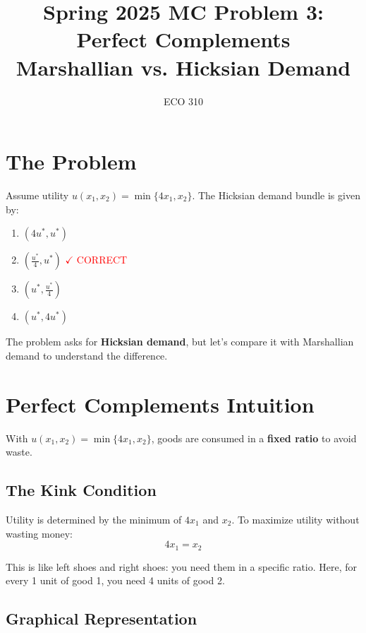 \documentclass[11pt]{article}
\title{Spring 2025 MC Problem 3: Perfect Complements\\Marshallian vs. Hicksian Demand}
\author{ECO 310}
\date{}
\begin{document}
\maketitle

\section{The Problem}

Assume utility $u(x_1, x_2) = \min\{4x_1, x_2\}$. The Hicksian demand bundle is given by:

\begin{enumerate}
    \item[(a)] $(4u^*, u^*)$
    \item[(b)] $\left(\frac{u^*}{4}, u^*\right)$ \quad \textcolor{red}{$\checkmark$ CORRECT}
    \item[(c)] $\left(u^*, \frac{u^*}{4}\right)$
    \item[(d)] $(u^*, 4u^*)$
\end{enumerate}

The problem asks for \textbf{Hicksian demand}, but let's compare it with Marshallian demand to understand the difference.

\section{Perfect Complements Intuition}

With $u(x_1, x_2) = \min\{4x_1, x_2\}$, goods are consumed in a \textbf{fixed ratio} to avoid waste.

\subsection{The Kink Condition}

Utility is determined by the minimum of $4x_1$ and $x_2$. To maximize utility without wasting money:
\[
\boxed{4x_1 = x_2}
\]

This is like left shoes and right shoes: you need them in a specific ratio. Here, for every 1 unit of good 1, you need 4 units of good 2.

\subsection{Graphical Representation}
\end{document}
